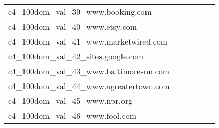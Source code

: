 {\begin{longtable}{m{6cm}m{1.7cm}m{1.7cm}m{1.7cm}m{1.7cm}m{1.7cm}}
	c4\_100dom\_val\_39\_www.booking.com  & \colorbox[HTML]{ffffe5}{\makebox[\mywidth][c]{8.84}} & \colorbox[HTML]{fafdcd}{\makebox[\mywidth][c]{8.49}} & \colorbox[HTML]{ffffe5}{\makebox[\mywidth][c]{8.83}} & \colorbox[HTML]{e9f6af}{\makebox[\mywidth][c]{8.41}} & \colorbox[HTML]{77c578}{\makebox[\mywidth][c]{8.32}}\\
	c4\_100dom\_val\_40\_www.etsy.com  & \colorbox[HTML]{fcfed8}{\makebox[\mywidth][c]{11.93}} & \colorbox[HTML]{ebf7b0}{\makebox[\mywidth][c]{11.66}} & \colorbox[HTML]{ffffe5}{\makebox[\mywidth][c]{12.66}} & \colorbox[HTML]{bde395}{\makebox[\mywidth][c]{11.52}} & \colorbox[HTML]{77c578}{\makebox[\mywidth][c]{11.43}}\\
	c4\_100dom\_val\_41\_www.marketwired.com  & \colorbox[HTML]{ffffe5}{\makebox[\mywidth][c]{7.66}} & \colorbox[HTML]{fafdce}{\makebox[\mywidth][c]{7.47}} & \colorbox[HTML]{ffffe5}{\makebox[\mywidth][c]{7.88}} & \colorbox[HTML]{ccea9c}{\makebox[\mywidth][c]{7.33}} & \colorbox[HTML]{77c578}{\makebox[\mywidth][c]{7.27}}\\
	c4\_100dom\_val\_42\_sites.google.com  & \colorbox[HTML]{fefee0}{\makebox[\mywidth][c]{14.23}} & \colorbox[HTML]{f2fab5}{\makebox[\mywidth][c]{13.81}} & \colorbox[HTML]{ffffe5}{\makebox[\mywidth][c]{14.91}} & \colorbox[HTML]{d5eea1}{\makebox[\mywidth][c]{13.68}} & \colorbox[HTML]{77c578}{\makebox[\mywidth][c]{13.51}}\\
	c4\_100dom\_val\_43\_www.baltimoresun.com  & \colorbox[HTML]{fefee3}{\makebox[\mywidth][c]{11.57}} & \colorbox[HTML]{eff8b3}{\makebox[\mywidth][c]{11.16}} & \colorbox[HTML]{ffffe5}{\makebox[\mywidth][c]{11.96}} & \colorbox[HTML]{dbf1a4}{\makebox[\mywidth][c]{11.09}} & \colorbox[HTML]{77c578}{\makebox[\mywidth][c]{10.95}}\\
	c4\_100dom\_val\_44\_www.agreatertown.com  & \colorbox[HTML]{ffffe5}{\makebox[\mywidth][c]{13.56}} & \colorbox[HTML]{fafdcd}{\makebox[\mywidth][c]{12.94}} & \colorbox[HTML]{ffffe5}{\makebox[\mywidth][c]{13.57}} & \colorbox[HTML]{ddf1a6}{\makebox[\mywidth][c]{12.77}} & \colorbox[HTML]{77c578}{\makebox[\mywidth][c]{12.64}}\\
	c4\_100dom\_val\_45\_www.npr.org  & \colorbox[HTML]{fdfede}{\makebox[\mywidth][c]{10.59}} & \colorbox[HTML]{e6f5ad}{\makebox[\mywidth][c]{10.30}} & \colorbox[HTML]{ffffe5}{\makebox[\mywidth][c]{11.14}} & \colorbox[HTML]{b6e092}{\makebox[\mywidth][c]{10.19}} & \colorbox[HTML]{77c578}{\makebox[\mywidth][c]{10.12}}\\
	c4\_100dom\_val\_46\_www.fool.com  & \colorbox[HTML]{ffffe5}{\makebox[\mywidth][c]{11.03}} & \colorbox[HTML]{f3fab6}{\makebox[\mywidth][c]{10.63}} & \colorbox[HTML]{ffffe5}{\makebox[\mywidth][c]{11.35}} & \colorbox[HTML]{e0f2a8}{\makebox[\mywidth][c]{10.56}} & \colorbox[HTML]{77c578}{\makebox[\mywidth][c]{10.42}}\\

\end{longtable}}
